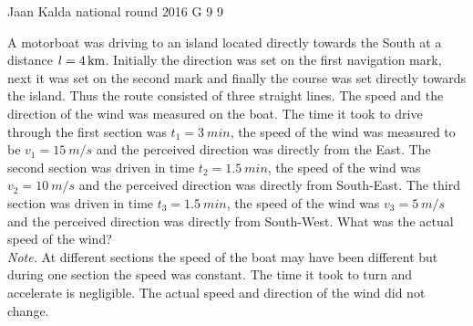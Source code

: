 \documentclass[11pt]{article}
\begin{document}
{Jaan Kalda} %
{national round} %
{2016} %
{G 9} %
{9} %
{

\ifEngStatement
A motorboat was driving to an island located directly towards the South at a distance $l=\SI 4{km}$. Initially the direction was set on the first navigation mark, next it was set on the second mark and finally the course was set directly towards the island. Thus the route consisted of three straight lines. The speed and the direction of the wind was measured on the boat. The time it took to drive through the first section was $t_1=\SI{3}{min}$, the speed of the wind was measured to be $v_1=\SI{15}{m/s}$ and the perceived direction was directly from the East. The second section was driven in time $t_2=\SI{1,5}{min}$, the speed of the wind was $v_2=\SI{10}{m/s}$ and the perceived direction was directly from South-East. The third section was driven in time $t_3=\SI{1,5}{min}$, the speed of the wind was $v_3=\SI{5}{m/s}$ and the perceived direction was directly from South-West. What was the actual speed of the wind?\\
\emph{Note.} At different sections the speed of the boat may have been different but during one section the speed was constant. The time it took to turn and accelerate is negligible. The actual speed and direction of the wind did not change.
\fi
}
\newpage\subsection{\protect{}}
\end{document}
